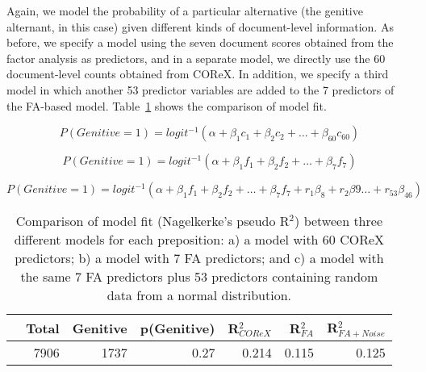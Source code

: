 Again, we model the probability of a particular alternative (the genitive alternant, in this case) given different kinds of document-level information.
As before, we specify a model using the seven document scores obtained from the factor analysis as predictors, and in a separate model, we directly use the 60 document-level counts obtained from COReX.
In addition, we specify a third model in which another 53 predictor variables are added to the 7 predictors of the FA-based model.
Table~\ref{mn-results} shows the comparison of model fit.

 
\begin{equation}
\label{mn-glm-allpreps-corex}
  P(Genitive=1) = logit^{-1}(\alpha + \beta_1 c_1 + \beta_2 c_2 + \dots + \beta_{60} c_{60})
\end{equation}



\begin{equation}
\label{mn-glm-allpreps-fa}
  P(Genitive=1) = logit^{-1}(\alpha + \beta_1 f_1 + \beta_2 f_2 + \dots + \beta_{7} f_{7})
\end{equation}


\begin{equation}
\label{mn-glm-allpreps-fa-rr}
  P(Genitive=1) = logit^{-1}(\alpha + \beta_1 f_1 + \beta_2 f_2 + \dots + \beta_{7} f_{7} + r_1 \beta_8 + r_2 \beta9 \ldots + r_{53} \beta_{46})
\end{equation}


\begin{table}
  \begin{tabular}{lrrrrrr}
  \toprule
             & Total  & Genitive & p(Genitive) & R$^2_{COReX}$ & R$^2_{FA}$ & R$^2_{FA+Noise}$\\
  \midrule
            & 7906   & 1737   & 0.27    & 0.214   & 0.115  & 0.125\\
%  
  \bottomrule
  \end{tabular}
  \caption{Comparison of model fit (Nagelkerke's pseudo R$^2$) between three different models for each preposition: a) a model with 60 COReX predictors; b) a model with 7 FA predictors; and c) a model with the same 7 FA predictors plus 53 predictors containing random data from a normal distribution.}\label{mn-results}
\end{table}
%


